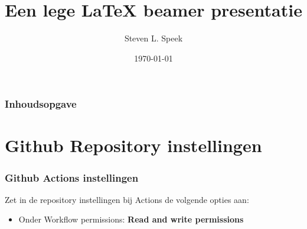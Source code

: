 \documentclass{beamer}
\title[\LaTeX{} beamer sjabloon] %
{Een lege \LaTeX{} beamer presentatie}
\author[S.L.Speek] %
{Steven L. Speek}
\institute[NLLGG] %
{
  Nederlandse Linux Gebruikers Groep 
}
\date[\today{}] %
{\today{}}
\begin{document}
\frame{\titlepage}


\begin{frame}
\frametitle{Inhoudsopgave}
\tableofcontents
\end{frame}


\section{Github Repository instellingen}

\begin{frame}
\frametitle{Github Actions instellingen}
Zet in de repository instellingen bij Actions de volgende opties aan:
\begin{itemize}
  \item Onder Workflow permissions: \textbf{Read and write permissions}
\end{itemize}

\end{frame}
\end{document}
